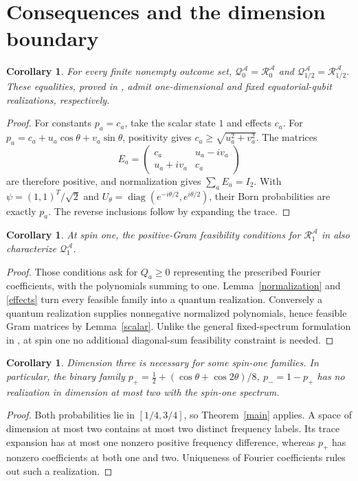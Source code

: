 \documentclass[11pt]{article}
\newtheorem{corollary}[theorem]{Corollary}
\newcommand{\diag}{\operatorname{diag}}
\begin{document}
\section{Consequences and the dimension boundary}
\begin{corollary}\label{lower}
For every finite nonempty outcome set,
$\mathcal Q_0^{\mathcal A}=\mathcal R_0^{\mathcal A}$ and
$\mathcal Q_{1/2}^{\mathcal A}=\mathcal R_{1/2}^{\mathcal A}$.
These equalities, proved in \cite[\S IV.A, Theorem~5]{AGJLM}, admit
one-dimensional and fixed equatorial-qubit realizations, respectively.
\end{corollary}
\begin{proof}
For constants $p_a=c_a$, take the scalar state $1$ and effects $c_a$.
For $p_a=c_a+u_a\cos\theta+v_a\sin\theta$, positivity gives
$c_a\geq\sqrt{u_a^2+v_a^2}$. The matrices
\[
 E_a=\begin{pmatrix}c_a&u_a-iv_a\\u_a+iv_a&c_a\end{pmatrix}
\]
are therefore positive, and normalization gives $\sum_a E_a=I_2$.
With $\psi=(1,1)^T/\sqrt2$ and
$U_\theta=\diag(e^{-i\theta/2},e^{i\theta/2})$, their Born probabilities
are exactly $p_a$. The reverse inclusions follow by expanding the trace.
\end{proof}

\begin{corollary}\label{sdp}
At spin one, the positive-Gram feasibility conditions for
$\mathcal R_1^{\mathcal A}$ in \cite[Lemma~10 and Appendix~B.2]{AGJLM}
also characterize $\mathcal Q_1^{\mathcal A}$.
\end{corollary}
\begin{proof}
Those conditions ask for $Q_a\geq0$ representing the prescribed Fourier
coefficients, with the polynomials summing to one. Lemma~\ref{normalization}
and \eqref{effects} turn every feasible family into a quantum realization.
Conversely a quantum realization supplies nonnegative normalized
polynomials, hence feasible Gram matrices by Lemma~\ref{scalar}.
Unlike the general fixed-spectrum formulation in \cite{Navascues}, at
spin one no additional diagonal-sum feasibility constraint is needed.
\end{proof}

\begin{corollary}\label{dimension}
Dimension three is necessary for some spin-one families. In particular,
the binary family $p_+=\tfrac12+(\cos\theta+\cos2\theta)/8$,
$p_-=1-p_+$ has no realization in dimension at most two with the
spin-one spectrum.
\end{corollary}
\begin{proof}
Both probabilities lie in $[1/4,3/4]$, so Theorem~\ref{main} applies.
A space of dimension at most two contains at most two distinct frequency
labels. Its trace expansion has at most one nonzero positive frequency
difference, whereas $p_+$ has nonzero coefficients at both one and two.
Uniqueness of Fourier coefficients rules out such a realization.
\end{proof}
\end{document}
